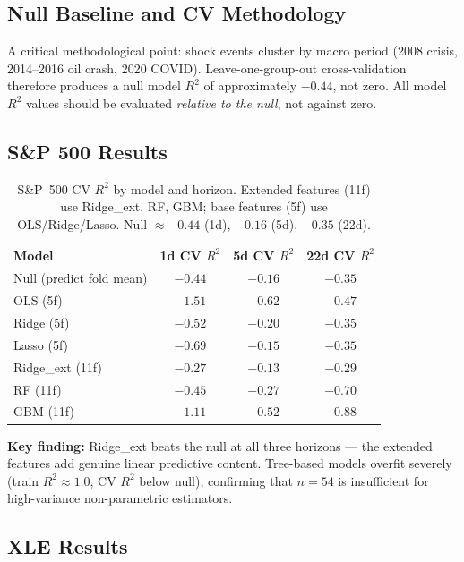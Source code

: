 \documentclass[11pt,a4paper]{article}
\begin{document}
\subsection{Null Baseline and CV Methodology}

A critical methodological point: shock events cluster by macro period (2008 crisis, 2014--2016 oil crash, 2020 COVID). Leave-one-group-out cross-validation therefore produces a null model $R^2$ of approximately $-0.44$, not zero. All model $R^2$ values should be evaluated \emph{relative to the null}, not against zero.

\subsection{S\&P 500 Results}

\begin{table}[H]
\centering
\caption{S\&P~500 CV $R^2$ by model and horizon. Extended features (11f) use Ridge\_ext, RF, GBM; base features (5f) use OLS/Ridge/Lasso. Null $\approx-0.44$ (1d), $-0.16$ (5d), $-0.35$ (22d).}
\label{tab:sp_results}
\small
\begin{tabular}{lccc}
\toprule
Model & 1d CV $R^2$ & 5d CV $R^2$ & 22d CV $R^2$ \\
\midrule
Null (predict fold mean)  & $-0.44$ & $-0.16$ & $-0.35$ \\
OLS (5f)                  & $-1.51$ & $-0.62$ & $-0.47$ \\
Ridge (5f)                & $-0.52$ & $-0.20$ & $-0.35$ \\
Lasso (5f)                & $-0.69$ & $-0.15$ & $-0.35$ \\
\midrule
Ridge\_ext (11f)          & $\mathbf{-0.27}$ & $\mathbf{-0.13}$ & $\mathbf{-0.29}$ \\
RF (11f)                  & $-0.45$ & $-0.27$ & $-0.70$ \\
GBM (11f)                 & $-1.11$ & $-0.52$ & $-0.88$ \\
\bottomrule
\end{tabular}
\end{table}

\textbf{Key finding:} Ridge\_ext beats the null at all three horizons — the extended features add genuine linear predictive content. Tree-based models overfit severely (train $R^2 \approx 1.0$, CV $R^2$ below null), confirming that $n=54$ is insufficient for high-variance non-parametric estimators.

\subsection{XLE Results}
\end{document}
